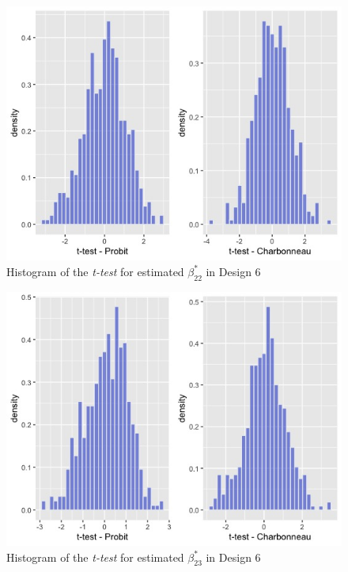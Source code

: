 \begin{figure}[htbp]
    \vspace{-2.5em}%
    \begin{adjustwidth}{-.5in}{-.5in}
    \centerline{\includegraphics[scale=.4]{content/Figures/ttest_beta22_Design6.png}}
    \caption{\footnotesize{Histogram of the \textit{t-test} for estimated $\beta_{22}^*$ in Design 6}}
    \label{fittest_beta22_Design6g}
\end{adjustwidth}
\end{figure}
\begin{figure}[htbp]
    \vspace{-2.5em}%
    \begin{adjustwidth}{-.5in}{-.5in}
    \centerline{\includegraphics[scale=.4]{content/Figures/ttest_beta23_Design6.png}}
    \caption{\footnotesize{Histogram of the \textit{t-test} for estimated $\beta_{23}^*$ in Design 6}}
    \label{ttest_beta23_Design6}
\end{adjustwidth}
\end{figure}
